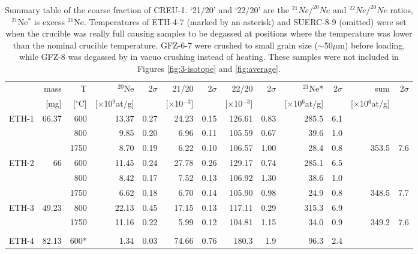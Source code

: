 \documentclass[authoryear,review,12pt]{elsarticle}
\begin{document}
\begin{table}
\centering
\caption{Summary table of the coarse fraction of CREU-1.  `21/20'
  and `22/20' are the $^{21}Ne/^{20}Ne$ and $^{22}Ne/^{20}Ne$ ratios,
  $^{21}$Ne$^*$ is excess $^{21}$Ne.  Temperatures of ETH-4-7 (marked
  by an asterisk) and SUERC-8-9 (omitted) were set when the crucible
  was really full causing samples to be degassed at positions where
  the temperature was lower than the nominal crucible
  temperature. GFZ-6-7 were crushed to small grain size
  ($\sim$50$\mu$m) before loading, while GFZ-8 was degassed by in
  vacuo crushing instead of heating. These samples were not included
  in Figures \ref{fig:3-isotope} and \ref{fig:average}.}
\label{tab:coarse}
   \begin{tabular}{|r|rrrrrrrrrrrr|}
\hline
          & mass  & T     & $^{20}$Ne  & 2$\sigma$    & 21/20 & 2$\sigma$    & 22/20 & 2$\sigma$    & $^{21}$Ne* & 
2$\sigma$    & sum   & 2$\sigma$ \\ 
          & [mg]    & [$^\circ$C]   & [$\times$10$^9$at/g] & & [$\times$10$^{-3}$] & 
 & [$\times$10$^{-3}$] & & [$\times$10$^6$at/g] & & 
[$\times$10$^6$at/g] & \\ 
\hline
    ETH-1 & 66.37 & 600   & 13.37 & 0.27  & 24.23 & 0.15  & 126.61 & 0.83  & 285.5 & 6.1   &       &  \\
    \hline
          &       & 800   & 9.85  & 0.20  & 6.96  & 0.11  & 105.59 & 0.67  & 39.6  & 1.0   &       &  \\
          &       & 1750  & 8.70  & 0.19  & 6.22  & 0.10  & 106.57 & 1.00  & 28.4  & 0.8   & 353.5 & 7.6 \\
    ETH-2 & 66    & 600   & 11.45 & 0.24  & 27.78 & 0.26  & 129.17 & 0.74  & 285.1 & 6.5   &       &  \\
          &       & 800   & 8.42  & 0.17  & 7.52  & 0.13  & 106.92 & 1.30  & 38.6  & 1.0   &       &  \\
          &       & 1750  & 6.62  & 0.18  & 6.70  & 0.14  & 105.90 & 0.98  & 24.9  & 0.8   & 348.5 & 7.7 \\
    ETH-3 & 49.23 & 800   & 22.13 & 0.45  & 17.15 & 0.13  & 117.11 & 0.29  & 315.3 & 6.9   &       &  \\
          &       & 1750  & 11.16 & 0.22  & 5.99  & 0.12  & 104.81 & 1.15  & 34.0  & 0.9   & 349.2 & 7.6 \\
          &       &       &       &       &       &       &       &       &       &       &       &  \\
    ETH-4 & 82.13 & 600*  & 1.34  & 0.03  & 74.66 & 0.76  & 180.3 & 1.9   & 96.3  & 2.4   &       &  \\

\end{tabular}
\end{table}
\end{document}
